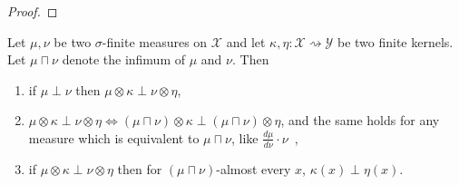 \begin{proof}\mathlibok
{}

\end{proof}


\begin{lemma}
  \label{lem:mutuallySingular_compProd}
  \mathlibok
  Let $\mu, \nu$ be two $\sigma$-finite measures on $\mathcal X$ and let $\kappa, \eta : \mathcal X \rightsquigarrow \mathcal Y$ be two finite kernels.
  Let $\mu \sqcap \nu$ denote the infimum of $\mu$ and $\nu$.
  Then
  \begin{enumerate}
    \item if $\mu \perp \nu$ then $\mu \otimes \kappa \perp \nu \otimes \eta$,
    \item $\mu \otimes \kappa \perp \nu \otimes \eta \iff (\mu \sqcap \nu) \otimes \kappa \perp (\mu \sqcap \nu) \otimes \eta$, and the same holds for any measure which is equivalent to $\mu \sqcap \nu$, like $\frac{d \mu}{d \nu} \cdot \nu$~,
    \item if $\mu \otimes \kappa \perp \nu \otimes \eta$ then for $(\mu \sqcap \nu)$-almost every $x$, $\kappa(x) \perp \eta(x)$.
  \end{enumerate}
\end{lemma}

